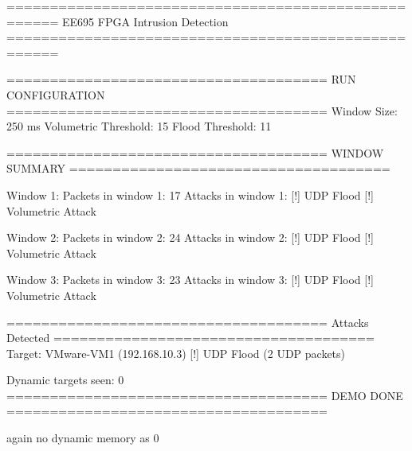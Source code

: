 
====================================================
        EE695 FPGA Intrusion Detection 
====================================================


=====================================
RUN CONFIGURATION
=====================================
Window Size: 250 ms
Volumetric Threshold: 15
Flood Threshold: 11


=====================================
WINDOW SUMMARY
=====================================

Window 1:
Packets in window 1: 17
Attacks in window 1:
  [!] UDP Flood
  [!] Volumetric Attack

Window 2:
Packets in window 2: 24
Attacks in window 2:
  [!] UDP Flood
  [!] Volumetric Attack

Window 3:
Packets in window 3: 23
Attacks in window 3:
  [!] UDP Flood
  [!] Volumetric Attack


=====================================
Attacks Detected
=====================================
Target: VMware-VM1 (192.168.10.3)
  [!] UDP Flood (2 UDP packets)

Dynamic targets seen: 0
=====================================
             DEMO DONE
=====================================



again no dynamic memory as 0